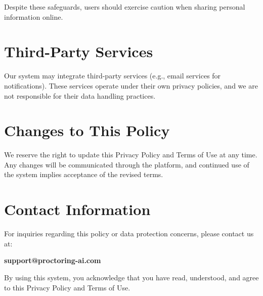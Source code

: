 \documentclass[a4paper,12pt]{article}
\begin{document}
Despite these safeguards, users should exercise caution when sharing personal information online.

\section{Third-Party Services}
Our system may integrate third-party services (e.g., email services for notifications). These services operate under their own privacy policies, and we are not responsible for their data handling practices.

\section{Changes to This Policy}
We reserve the right to update this Privacy Policy and Terms of Use at any time. Any changes will be communicated through the platform, and continued use of the system implies acceptance of the revised terms.

\section{Contact Information}
For inquiries regarding this policy or data protection concerns, please contact us at:
\begin{center}
    \textbf{support@proctoring-ai.com}
\end{center}

By using this system, you acknowledge that you have read, understood, and agree to this Privacy Policy and Terms of Use.
\end{document}
